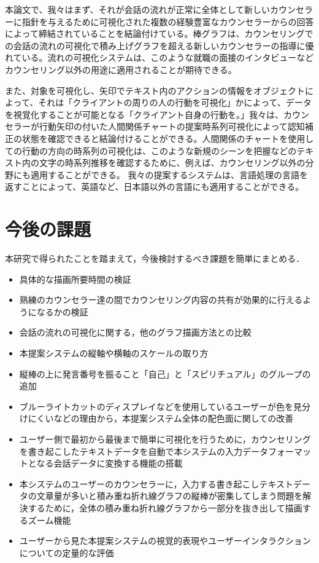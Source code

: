 \documentclass[shuuron]{kuee}
\begin{document}
本論文で、我々はまず、それが会話の流れが正常に全体として新しいカウンセラーに指針を与えるために可視化された複数の経験豊富なカウンセラーからの回答によって締結されていることを結論付けている。棒グラフは、カウンセリングでの会話の流れの可視化で積み上げグラフを超える新しいカウンセラーの指導に優れている。流れの可視化システムは、このような就職の面接のインタビューなどカウンセリング以外の用途に適用されることが期待できる。

  また、対象を可視化し、矢印でテキスト内のアクションの情報をオブジェクトによって、それは「クライアントの周りの人の行動を可視化」かによって、データを視覚化することが可能となる「クライアント自身の行動を。」我々は、カウンセラーが行動矢印の付いた人間関係チャートの提案時系列可視化によって認知補正の状態を確認できると結論付けることができる。人間関係のチャートを使用しての行動の方向の時系列の可視化は、このような新規のシーンを把握などのテキスト内の文字の時系列推移を確認するために、例えば、カウンセリング以外の分野にも適用することができる。
    我々の提案するシステムは、言語処理の言語を返すことによって、英語など、日本語以外の言語にも適用することができる。



\section{今後の課題}

本研究で得られたことを踏まえて，今後検討するべき課題を簡単にまとめる．

\begin{itemize}
\item 具体的な描画所要時間の検証
\item 熟練のカウンセラー達の間でカウンセリング内容の共有が効果的に行えるようになるかの検証
\item 会話の流れの可視化に関する，他のグラフ描画方法との比較
\item 本提案システムの縦軸や横軸のスケールの取り方
\item 縦棒の上に発言番号を振ること「自己」と「スピリチュアル」のグループの追加
\item ブルーライトカットのディスプレイなどを使用しているユーザーが色を見分けにくいなどの理由から，本提案システム全体の配色面に関しての改善
\item ユーザー側で最初から最後まで簡単に可視化を行うために，カウンセリングを書き起こしたテキストデータを自動で本システムの入力データフォーマットとなる会話データに変換する機能の搭載
\item 本システムのユーザーのカウンセラーに，入力する書き起こしテキストデータの文章量が多いと積み重ね折れ線グラフの縦棒が密集してしまう問題を解決するために，全体の積み重ね折れ線グラフから一部分を抜き出して描画するズーム機能
\item ユーザーから見た本提案システムの視覚的表現やユーザーインタラクションについての定量的な評価
\end{itemize}
\end{document}
